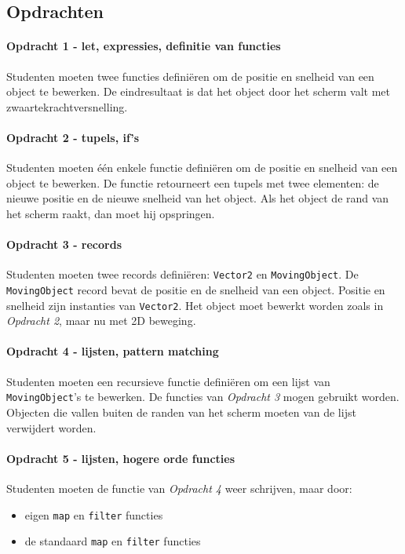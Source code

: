 	\subsection{Opdrachten}
	
		\paragraph{Opdracht 1 - let, expressies, definitie van functies}
			Studenten moeten twee functies definiëren om de positie en snelheid van een object te bewerken. De eindresultaat is dat het object door het scherm valt met zwaartekrachtversnelling.

		\paragraph{Opdracht 2 - tupels, if's}
			Studenten moeten één enkele functie definiëren om de positie en snelheid van een object te bewerken. De functie retourneert een tupels met twee elementen: de nieuwe positie en de nieuwe snelheid van het object. Als het object de rand van het scherm raakt, dan moet hij opspringen.
			
		\paragraph{Opdracht 3 - records}
			Studenten moeten twee records definiëren: \texttt{Vector2} en \texttt{MovingObject}. De \texttt{MovingObject} record bevat de positie en de snelheid van een object. Positie en snelheid zijn instanties van \texttt{Vector2}. Het object moet bewerkt worden zoals in \textit{Opdracht 2}, maar nu met 2D beweging.
			
		\paragraph{Opdracht 4 - lijsten, pattern matching}
			Studenten moeten een recursieve functie definiëren om een lijst van \texttt{MovingObject}'s te bewerken. De functies van \textit{Opdracht 3} mogen gebruikt worden. Objecten die vallen buiten de randen van het scherm moeten van de lijst verwijdert worden.
			
		\paragraph{Opdracht 5 - lijsten, hogere orde functies}
			Studenten moeten de functie van \textit{Opdracht 4} weer schrijven, maar door:
				\begin{itemize}
					\item eigen \texttt{map} en \texttt{filter} functies
					\item de standaard \texttt{map} en \texttt{filter} functies
				\end{itemize}

